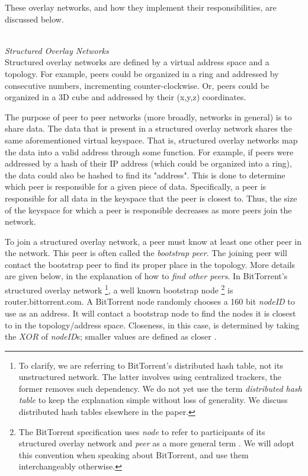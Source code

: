 \documentclass[a4paper]{article}
\begin{document}
These overlay networks, and how they implement their responsibilities, are discussed below.

\hfill \\
\textit{Structured Overlay Networks}
\hfill \\

Structured overlay networks are defined by a virtual address space and a topology. For example, peers could be organized in a ring and addressed by consecutive numbers, incrementing counter-clockwise. Or, peers could be organized in a 3D cube and addressed by their (x,y,z) coordinates.

The purpose of peer to peer networks (more broadly, networks in general) is to share data. The data that is present in a structured overlay network shares the same aforementioned virtual keyspace. That is, structured overlay networks map the data into a valid address through some function. For example, if peers were addressed by a hash of their IP address (which could be organized into a ring), the data could also be hashed to find its "address". This is done to determine which peer is responsible for a given piece of data. Specifically, a peer is responsible for all data in the keyspace that the peer is closest to. Thus, the size of the keyspace for which a peer is responsible decreases as more peers join the network.

To join a structured overlay network, a peer must know at least one other peer in the network. This peer is often called the \textit{bootstrap peer}. The joining peer will contact the bootstrap peer to find its proper place in the topology. More details are given below, in the explanation of how to \textit{find other peers}. In BitTorrent's structured overlay network \footnote{To clarify, we are referring to BitTorrent's distributed hash table, not its unstructured network. The latter involves using centralized trackers, the former removes such dependency. We do not yet use the term \textit{distributed hash table} to keep the explanation simple without loss of generality. We discuss distributed hash tables elsewhere in the paper.}, a well known bootstrap node \footnote{The BitTorrent specification uses \textit{node} to refer to participants of its structured overlay network and \textit{peer} as a more general term \cite{bittorrentDHT}. We will adopt this convention when speaking about BitTorrent, and use them interchangeably otherwise.} is router.bittorrent.com. A BitTorrent node randomly chooses a 160 bit \textit{nodeID} to use as an address. It will contact a bootstrap node to find the nodes it is closest to in the topology/address space. Closeness, in this case, is determined by taking the $XOR$ of \textit{nodeID}s; smaller values are defined as closer \cite{bittorrentDHT}.
\end{document}
